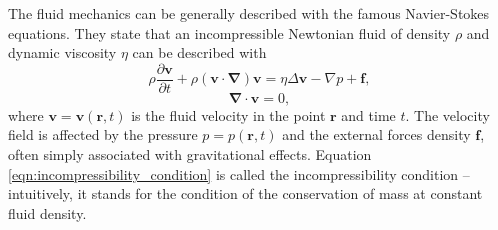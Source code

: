 \documentclass{master_thesis}
\begin{document}
The fluid mechanics can be generally described with the famous Navier-Stokes equations. They state that an incompressible Newtonian fluid of density $\rho$ and dynamic viscosity $\eta$ can be described with
\begin{equation}
    \rho \frac{\partial\boldsymbol{v}}{\partial t} + \rho(\boldsymbol{v \cdot \nabla})\boldsymbol{v} = \eta\Delta\boldsymbol{v}-\nabla p + \boldsymbol{f},
\label{eqn:incompressible_ns}
\end{equation}
\begin{equation}
    \boldsymbol{\nabla \cdot v}=0,
\label{eqn:incompressibility_condition}
\end{equation}
where $\boldsymbol{v}=\boldsymbol{v}(\boldsymbol{r},t)$ is the fluid velocity in the point $\boldsymbol{r}$ and time $t$. The velocity field is affected by the pressure $p=p(\boldsymbol{r},t)$ and the external forces density $\boldsymbol{f}$, often simply associated with gravitational effects. Equation \eqref{eqn:incompressibility_condition} is called the incompressibility condition -- intuitively, it stands for the condition of the conservation of mass at constant fluid density.
\end{document}
